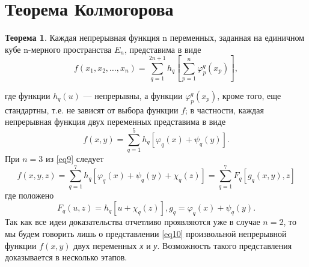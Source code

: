\documentclass[12pt, twoside]{article}
\theoremstyle{definition}
\newtheorem*{theorem*}{Теорема}
\begin{document}
\section{Теорема Колмогорова}
\begin{theorem*}
Каждая непрерывная функция n переменных, заданная на единичном кубе n-мерного пространства $E_n$, представима в виде
\begin{equation}\label{eq9}
f(x_1,x_2,\dots,x_n) = \sum\limits_{q=1}^{2n+1}h_q[\sum\limits_{p=1}^{n}\varphi_p^{q}(x_p)],
\end{equation}
\end{theorem*}
где функции $h_q(u)$ — непрерывны, а функции $\varphi_p^{q}(x_p)$, кроме того, еще
стандартны, т.е. не зависят от выбора функции $f$; в частности, каждая непрерывная функция двух переменных представима в виде
\begin{equation}\label{eq10}
f(x,y) = \sum\limits_{q=1}^{5}h_q[\varphi_q(x)+\psi_{q}(y)].
\end{equation}
При $n=3$ из \eqref{eq9} следует 
\begin{equation}\label{eq11}
f(x,y,z) = \sum\limits_{q=1}^{7}h_q[\varphi_q(x)+\psi_{q}(y)+\chi_{q}(z)] = \sum\limits_{q=1}^{7}F_{q}[g_q(x,y),z]
\end{equation}
где положено 
\begin{equation}\label{eq12}
F_{q}(u,z) = h_{q}[u+\chi_{q}(z)], g_{q} = \varphi_{q}(x)+\psi_{q}(y).
\end{equation}
Так как все идеи доказательства отчетливо проявляются уже в случае $n=2$, то мы будем говорить лишь о представлении \eqref{eq10} произвольной непрерывной функции $f(x,y)$ двух переменных \textit{х} и \textit{у}. Возможность такого представления доказывается в несколько этапов.
\end{document}
